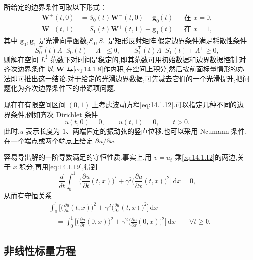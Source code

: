 所给定的边界条件可取以下形式：
\begin{equation}\label{eq:14.1.18}
  \begin{aligned}
    \boldsymbol{W}^+(t,0)&=S_0(t)\boldsymbol{W}^-(t,0)+\boldsymbol{g}_0(t)
        &&\text{在 }x=0,\\
    \boldsymbol{W}^-(t,1)&=S_1(t)\boldsymbol{W}^+(t,1)+\boldsymbol{g}_1(t)
        &&\text{在 }x=1,
  \end{aligned}
\end{equation}
其中 \(\boldsymbol{g}_0,\boldsymbol{g}_1\) 是光滑向量函数,\(S_0,S_1\) 是矩形反射矩阵.假定边界条件满足耗散性条件
\[
  S_0^{\mathsf T}(t)\Lambda^+S_0(t)+\Lambda^-\le0,\qquad
  S_1^{\mathsf T}(t)\Lambda^-S_1(t)+\Lambda^+\ge0,
\]
则解在空间 \(L^2\) 范数下对时间是稳定的,即其范数可用初始数据和边界数据控制.对齐次边界条件,以 \(\boldsymbol{W}\) 与\eqref{eq:14.1.8}作内积,在空间上积分,然后按前面标量情形的办法即可推出这一结论.对于给定的光滑边界数据,可先减去它们的一个光滑提升,把问题化为齐次边界条件下的带源项问题.

\begin{example}[有限区间上的波动方程]\label{ex:14.1.wave-interval}
现在在有限空间区间 \((0,1)\) 上考虑波动方程\eqref{eq:14.1.12}.可以指定几种不同的边界条件,例如齐次 Dirichlet 条件
\begin{equation}\label{eq:14.1.19}
  u(t,0)=0,\qquad u(t,1)=0,\qquad t>0.
\end{equation}
此时,\(u\) 表示长度为 \(1\)、两端固定的振动弦的竖直位移.也可以采用 Neumann 条件,在一个端点或两个端点上给定 \(\partial u/\partial x\).

容易导出解的一阶导数满足的守恒性质.事实上,用 \(v=u_t\) 乘\eqref{eq:14.1.12}的两边,关于 \(x\) 积分,再用\eqref{eq:14.1.19},得到
\[
  \frac{d}{dt}\int_0^1\biggl[
    \biggl(\frac{\partial u}{\partial t}(t,x)\biggr)^2
     +\gamma^2\biggl(\frac{\partial u}{\partial x}(t,x)\biggr)^2\biggr]\,\mathrm dx=0,
\]
从而有守恒关系
\[
  \begin{aligned}
    &\int_0^1\biggl[
      \biggl(\frac{\partial u}{\partial t}(t,x)\biggr)^2
       +\gamma^2\biggl(\frac{\partial u}{\partial x}(t,x)\biggr)^2\biggr]\,\mathrm dx\\
    &\quad=\int_0^1\biggl[
      \biggl(\frac{\partial u}{\partial t}(0,x)\biggr)^2
       +\gamma^2\biggl(\frac{\partial u}{\partial x}(0,x)\biggr)^2\biggr]\,\mathrm dx
       \qquad\forall t\ge0.
  \end{aligned}
\]
\end{example}

\subsection{非线性标量方程}\label{sec:14.1.4}

